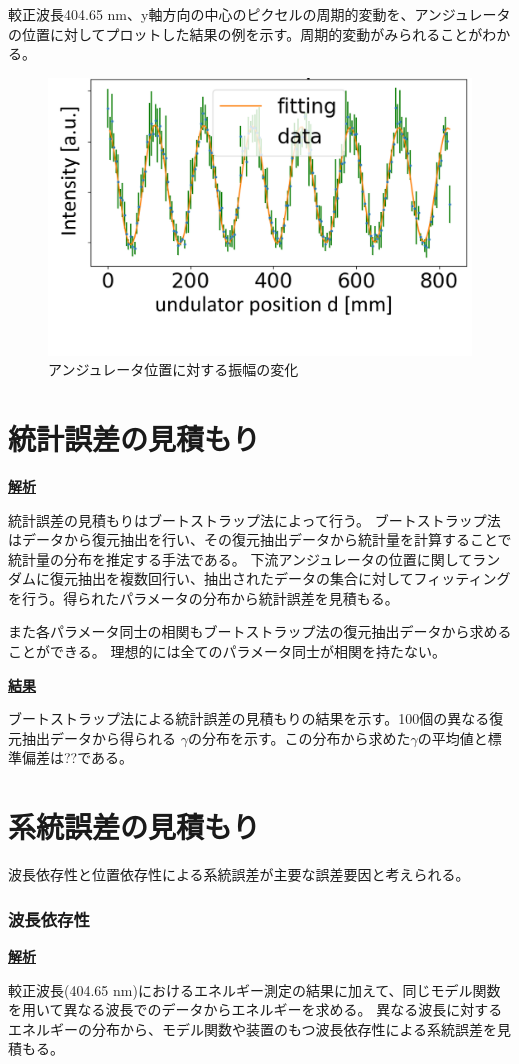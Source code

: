 \documentclass[a4paper,11pt,uplatex]{jsbook}
\begin{document}
較正波長404.65 nm、y軸方向の中心のピクセルの周期的変動を、アンジュレータの位置に対してプロットした結果の例を示す。周期的変動がみられることがわかる。
\begin{figure}
  \centering
  \includegraphics[width=0.8\linewidth]{image/4-oscillation.png}
  \caption{アンジュレータ位置に対する振幅の変化}
\end{figure}

\section{統計誤差の見積もり}
\noindent \textbf{\underline{解析}}\par
統計誤差の見積もりはブートストラップ法によって行う。
ブートストラップ法はデータから復元抽出を行い、その復元抽出データから統計量を計算することで統計量の分布を推定する手法である。
下流アンジュレータの位置に関してランダムに復元抽出を複数回行い、抽出されたデータの集合に対してフィッティングを行う。得られたパラメータの分布から統計誤差を見積もる。

また各パラメータ同士の相関もブートストラップ法の復元抽出データから求めることができる。
理想的には全てのパラメータ同士が相関を持たない。

\noindent \textbf{\underline{結果}}\par
ブートストラップ法による統計誤差の見積もりの結果を示す。100個の異なる復元抽出データから得られる
$\gamma$の分布を示す。この分布から求めた$\gamma$の平均値と標準偏差は??である。
\section{系統誤差の見積もり}
波長依存性と位置依存性による系統誤差が主要な誤差要因と考えられる。
\subsubsection{波長依存性}
\noindent \textbf{\underline{解析}}\par
較正波長(404.65 nm)におけるエネルギー測定の結果に加えて、同じモデル関数を用いて異なる波長でのデータからエネルギーを求める。
異なる波長に対するエネルギーの分布から、モデル関数や装置のもつ波長依存性による系統誤差を見積もる。
\end{document}
